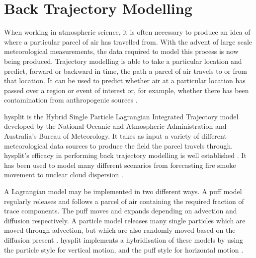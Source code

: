 




	\section{Back Trajectory Modelling}
	\label{sec:backtraj}

	When working in atmospheric science, it is often necessary to produce an idea of where a particular parcel of air has travelled from. With the advent of large scale meteorological measurements, the data required to model this process is now being produced. Trajectory modelling is able to take a particular location and predict, forward or backward in time, the path a parcel of air travels to or from that location. It can be used to predict whether air at a particular location has passed over a region or event of interest or, for example, whether there has been contamination from anthropogenic sources \citep{draxler:1998vr}.

	\gls{hysplit} is the Hybrid Single Particle Lagrangian Integrated Trajectory model developed by the National Oceanic and Atmospheric Administration and Australia's Bureau of Meteorology. It takes as input a variety of different meteorological data sources to produce the field the parcel travels through. \gls{hysplit}'s efficacy in performing back trajectory modelling is well established \citep{draxler:1998vr}. It has been used to model many different scenarios from forecasting fire smoke movement \citep{rolph:2010in} to nuclear cloud dispersion \citep{rolph:2014kk}.

	A Lagrangian model may be implemented in two different ways. A puff model regularly releases and follows a parcel of air containing the required fraction of trace components. The puff moves and expands depending on advection and diffusion respectively. A particle model releases many single particles which are moved through advection, but which are also randomly moved based on the diffusion present \citep{draxler:1997tga}. \gls{hysplit} implements a hybridisation of these models by using the particle style for vertical motion, and the puff style for horizontal motion \citep{hurley:1994df}.

